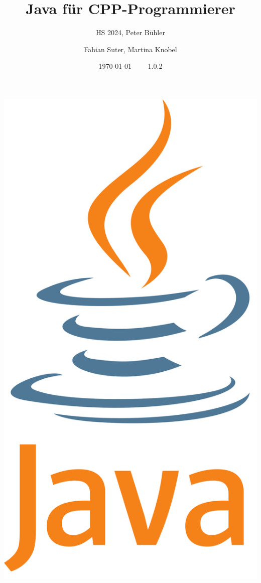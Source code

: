 \documentclass[fontsize=8pt, a4paper, fleqn, landscape, DIV=calc]{scrartcl}
\title{\vspace{-1cm}Java für CPP-Programmierer}
\subtitle{HS 2024, Peter Bühler}
\author{Fabian Suter, Martina Knobel}
\date{{\small \today $\qquad$ 1.0.2}}
\begin{document}
	\begin{multicols*}{3}
        \raggedcolumns
        \begin{minipage}{0.75\columnwidth}
		      \maketitle
        \end{minipage}
        \begin{minipage}{0.1\columnwidth}
            \includegraphics[width=0.7\linewidth]{pictures/Java-Logo.png}
        \end{minipage}
        \begin{minipage}{0.1\columnwidth}
            \begin{center}
                \quad
                \qquad    
            \end{center}
        \end{minipage}
        
        \thispagestyle{fancy}%

        
        
        
        
        
        
        
        
        
        
        
	\end{multicols*}
\end{document}
